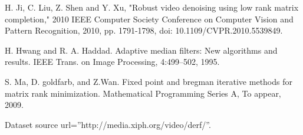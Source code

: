 \documentclass{article}
\begin{document}
\begin{thebibliography}{}
 H. Ji, C. Liu, Z. Shen and Y. Xu, "Robust video denoising using low rank matrix completion," 2010 IEEE Computer Society Conference on Computer Vision and Pattern Recognition, 2010, pp. 1791-1798, doi: 10.1109/CVPR.2010.5539849.

 H. Hwang and R. A. Haddad. Adaptive median filters: New algorithms and results. IEEE Trans. on Image Processing,
4:499–502, 1995.

 S. Ma, D. goldfarb, and Z.Wan. Fixed point and bregman iterative methods for matrix rank minimization. Mathematical
Programming Series A, To appear, 2009.

 Dataset source url=”http://media.xiph.org/video/derf/”.

\end{thebibliography}
\end{document}
